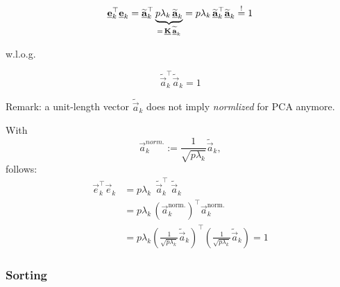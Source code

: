 \begin{frame}{\subsubsecname}


\begin{equation}
\label{eq:eignorm}
\underline{\mathbf{e}}^{\top}_k \underline{\mathbf{e}}_k = 
\widetilde {\underline{\mathbf{a}}}_k^\top 
\underbrace{p \lambda_k \, \widetilde {\underline{\mathbf{a}}}_k}_{=\, \underline{\mathbf{K}} \, \widetilde {\underline{\mathbf{a}}}_k} 
= p \lambda_k \, \widetilde {\underline{\mathbf{a}}}_k^\top \widetilde {\underline{\mathbf{a}}}_k  \stackrel{\mathrm{!}}{=} 1
\end{equation}

\pause

w.l.o.g.

\svspace{-7mm}

\begin{equation}
\widetilde {\vec a}_k^\top \widetilde {\vec a}_k = 1
\end{equation}

Remark: a unit-length vector $\widetilde {\vec a}_k$ does not imply \emph{normlized} for PCA anymore.

\pause

With
\svspace{-5mm}
\begin{equation}
\vec a_k^{norm.} := \frac{1}{\sqrt{p \lambda_k}} \widetilde {\vec a}_k,
\end{equation}
follows:
\svspace{-5mm}
\begin{align}
\vec e^{\top}_k \vec e_k 
&= p \lambda_k \, \; \widetilde {\vec a}_k^\top \; \widetilde {\vec a}_k\\
&= p \lambda_k \, \left(\vec a_k^{\text{norm.}}\right)^\top \vec a_k^{\text{norm.}} \\
&= p \lambda_k \left(\frac{1}{\sqrt{p \lambda_k}} \widetilde {\vec a}_k\right)^\top \left(\frac{1}{\sqrt{p \lambda_k}} \widetilde {\vec a}_k\right)
= 1
\end{align}

\end{frame}

\subsubsection{Sorting}

